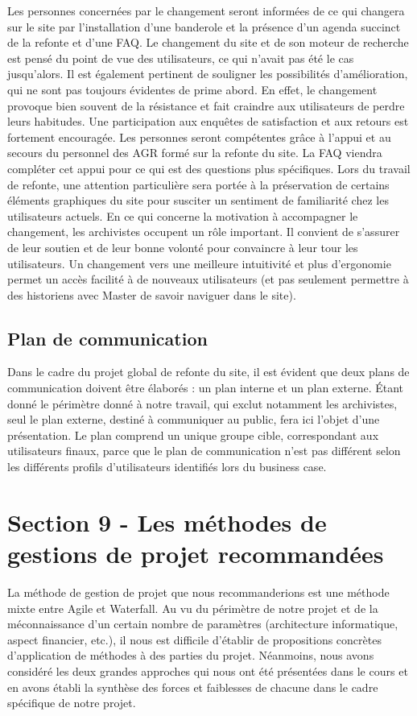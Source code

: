 \documentclass[a4paper,12pt]{article}
\begin{document}
Les personnes concernées par le changement seront informées de ce qui changera sur le site par l’installation d’une banderole et la présence d’un agenda succinct de la refonte et d’une FAQ. Le changement du site et de son moteur de recherche est pensé du point de vue des utilisateurs, ce qui n’avait pas été le cas jusqu’alors. Il est également pertinent de souligner les possibilités d’amélioration, qui ne sont pas toujours évidentes de prime abord. En effet, le changement provoque bien souvent de la résistance et fait craindre aux utilisateurs de perdre leurs habitudes. Une participation aux enquêtes de satisfaction et aux retours est fortement encouragée.
Les personnes seront compétentes grâce à l’appui et au secours du personnel des AGR formé sur la refonte du site. La FAQ viendra compléter cet appui pour ce qui est des questions plus spécifiques. Lors du travail de refonte, une attention particulière sera portée à la préservation de certains éléments graphiques du site pour susciter un sentiment de familiarité chez les utilisateurs actuels.
En ce qui concerne la motivation à accompagner le changement, les archivistes occupent un rôle important. Il convient de s’assurer de leur soutien et de leur bonne volonté pour convaincre à leur tour les utilisateurs. Un changement vers une meilleure intuitivité et plus d’ergonomie permet un accès facilité à de nouveaux utilisateurs (et pas seulement permettre à des historiens avec Master de savoir naviguer dans le site).

\subsection{Plan de communication}
Dans le cadre du projet global de refonte du site, il est évident que deux plans de communication doivent être élaborés : un plan interne et un plan externe. Étant donné le périmètre donné à notre travail, qui exclut notamment les archivistes, seul le plan externe, destiné à communiquer au public, fera ici l’objet d’une présentation.
Le plan comprend un unique groupe cible, correspondant aux utilisateurs finaux, parce que le plan de communication n’est pas différent selon les différents profils d’utilisateurs identifiés lors du business case.

\section{Section 9 - Les méthodes de gestions de projet recommandées}
La méthode de gestion de projet que nous recommanderions est une méthode mixte entre Agile et Waterfall. Au vu du périmètre de notre projet et de la méconnaissance d’un certain nombre de paramètres (architecture informatique, aspect financier, etc.), il nous est difficile d’établir de propositions concrètes d’application de méthodes à des parties du projet. Néanmoins, nous avons considéré les deux grandes approches qui nous ont été présentées dans le cours et en avons établi la synthèse des forces et faiblesses de chacune dans le cadre spécifique de notre projet.
\end{document}

